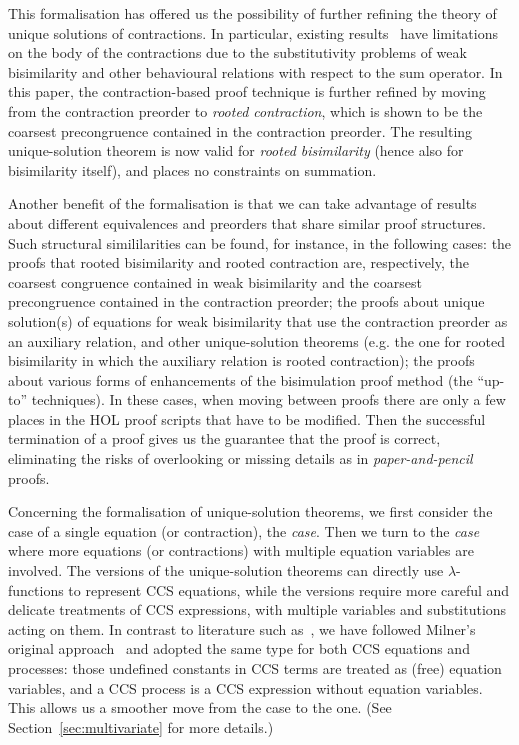 This formalisation has offered us the possibility of
further refining the theory of unique solutions of contractions.
In particular,  existing results~\cite{sangiorgi2017equations} have
limitations on the body of the contractions due to the
substitutivity problems of weak bisimilarity and other behavioural relations with respect
to the sum operator.
In this paper, the contraction-based proof technique is further
refined by moving from the contraction preorder to
\emph{rooted contraction}, which is shown to be the coarsest
precongruence contained in the contraction preorder.
The resulting unique-solution theorem is now valid for
\emph{rooted bisimilarity} (hence also for bisimilarity itself), and places no 
constraints on summation.

Another benefit of the formalisation is 
that we can take advantage of results about different 
equivalences and preorders that share similar proof structures.
Such structural simililarities can be found, for instance, in the
following cases: the proofs that rooted bisimilarity and rooted
contraction are, respectively, the coarsest congruence contained in
weak bisimilarity and the coarsest precongruence contained in the
contraction preorder; the proofs about unique solution(s) of equations
for weak bisimilarity that use the contraction preorder as an
auxiliary relation, and other unique-solution theorems (e.g. the one
for rooted bisimilarity 
 in which the auxiliary relation is rooted contraction); the
proofs about various forms of enhancements of the bisimulation proof
method (the ``up-to'' techniques).
%
In these cases, when moving between proofs there are only a few places in
the HOL proof scripts that have to be modified.
Then the successful termination of a proof gives us the
 guarantee that the proof is correct, eliminating the risks 
of overlooking or missing details as in \emph{paper-and-pencil} proofs.

Concerning the formalisation of unique-solution theorems,
we first consider the case of a single equation (or contraction), the
\emph{\univariate case}.
Then we turn to the \emph{\multivariate case} where more equations
  (or contractions) with multiple equation variables are involved.
  The \univariate versions of the unique-solution theorems
  can directly use
$\lambda$-functions to represent CCS equations,
while the \multivariate versions require
more careful and delicate treatments of CCS
expressions, with multiple variables and substitutions acting on them.
In contrast to literature such as~\cite{Gorrieri:2015jt},
we have followed Milner's original approach~\cite{milner1990operational} and adopted the same
type for both CCS equations and processes: those undefined constants
in CCS terms are treated as  (free) equation variables, and a CCS
process is a CCS expression without equation variables.  %
This allows us a smoother move from the \univariate case to the \multivariate
one. (See Section~\ref{sec:multivariate} for more details.)

